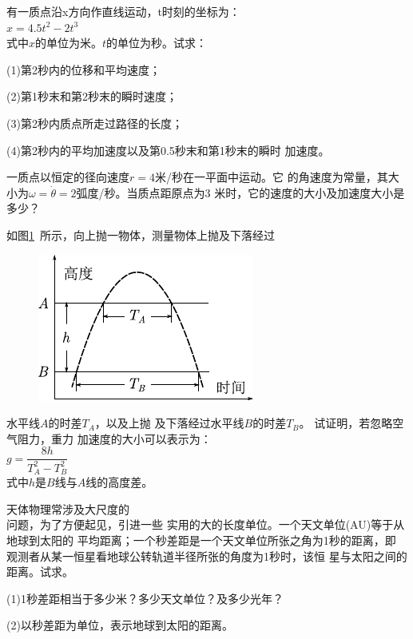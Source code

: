\exercise 有一质点沿x方向作直线运动，t时刻的坐标为：\\
\null\qquad\qquad \qquad $x=4.5t^2-2t^3$\\
式中$x$的单位为米。$t$的单位为秒。试求：

(1)第2秒内的位移和平均速度；

(2)第1秒末和第2秒末的瞬时速度；

(3)第2秒内质点所走过路径的长度；

(4)第2秒内的平均加速度以及第0.5秒末和第1秒末的瞬时
加速度。

\exercise 一质点以恒定的径向速度$r=4$米/秒在一平面中运动。它
的角速度为常量，其大小为$\omega=\dot\theta=2$弧度/秒。当质点距原点为3
米时，它的速度的大小及加速度大小是多少？

\exercise 如图\ref{fig:01.29}~所示，向上抛一物体，测量物体上抛及下落经过
\begin{figure}
    \begin{center}
        \includegraphics{figure/fig01.29}
        \caption{}
        \label{fig:01.29}
    \end{center}
\end{figure}
水平线$A$的时差$T_A$，以及上抛
及下落经过水平线$B$的时差$T_B$。
试证明，若忽略空气阻力，重力
加速度的大小可以表示为：\\
\null\qquad \qquad$g=\dfrac{8h}{T_A^2 - T_B^2}$ \\
式中$h$是$B$线与$A$线的高度差。

\exercise 天体物理常涉及大尺度的\\
问题，为了方便起见，引进一些
\clearpage
\noindent 实用的大的长度单位。一个天文单位(AU)等于从地球到太阳的
平均距离；一个秒差距是一个天文单位所张之角为1秒的距离，即
观测者从某一恒星看地球公转轨道半径所张的角度为1秒时，该恒
星与太阳之间的距离。试求。

(1)1秒差距相当于多少米？多少天文单位？及多少光年？

(2)以秒差距为单位，表示地球到太阳的距离。

